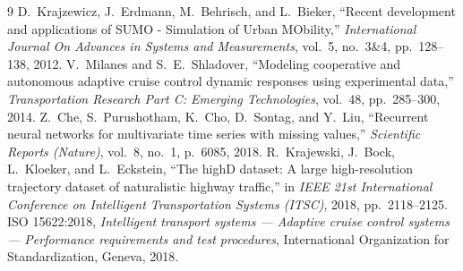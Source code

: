 \documentclass[11pt,a4paper]{article}
\begin{document}
\vspace{0.8em}

\begin{thebibliography}{9}
 D.~Krajzewicz, J.~Erdmann, M.~Behrisch, and L.~Bieker, ``Recent development and applications of SUMO - Simulation of Urban MObility,'' \emph{International Journal On Advances in Systems and Measurements}, vol.~5, no.~3\&4, pp.~128--138, 2012.
 V.~Milanes and S.~E.~Shladover, ``Modeling cooperative and autonomous adaptive cruise control dynamic responses using experimental data,'' \emph{Transportation Research Part C: Emerging Technologies}, vol.~48, pp.~285--300, 2014.
 Z.~Che, S.~Purushotham, K.~Cho, D.~Sontag, and Y.~Liu, ``Recurrent neural networks for multivariate time series with missing values,'' \emph{Scientific Reports (Nature)}, vol.~8, no.~1, p.~6085, 2018.
 R.~Krajewski, J.~Bock, L.~Kloeker, and L.~Eckstein, ``The highD dataset: A large high-resolution trajectory dataset of naturalistic highway traffic,'' in \emph{IEEE 21st International Conference on Intelligent Transportation Systems (ITSC)}, 2018, pp.~2118--2125.
 ISO 15622:2018, \emph{Intelligent transport systems --- Adaptive cruise control systems --- Performance requirements and test procedures}, International Organization for Standardization, Geneva, 2018.
\end{thebibliography}
\end{document}
